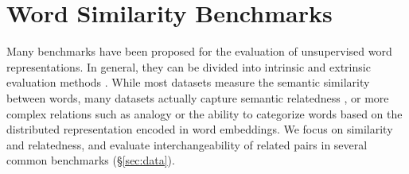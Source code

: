 \documentclass[11pt,a4paper]{article}
\begin{document}
    
    
    \section{Word Similarity Benchmarks}\label{sec:benchmarks}
    
    Many benchmarks have been proposed for the evaluation of unsupervised word
    representations.
    In general, they can be divided into intrinsic and extrinsic evaluation methods
    \cite{schnabel2015evaluation,chiu2016intrinsic,jastrzebski2017evaluate,alshargi2018concept2vec,bakarov2018survey}.
    While most datasets measure the semantic similarity between words,
    many datasets actually capture semantic relatedness
    \cite{hill2015simlex,avraham2016improving},
    or more complex relations such as analogy or the ability to categorize
    words based on the distributed representation encoded in word embeddings.
    We focus on similarity and relatedness, and evaluate interchangeability
    of related pairs in several common benchmarks (\S\ref{sec:data}).
    
\end{document}
